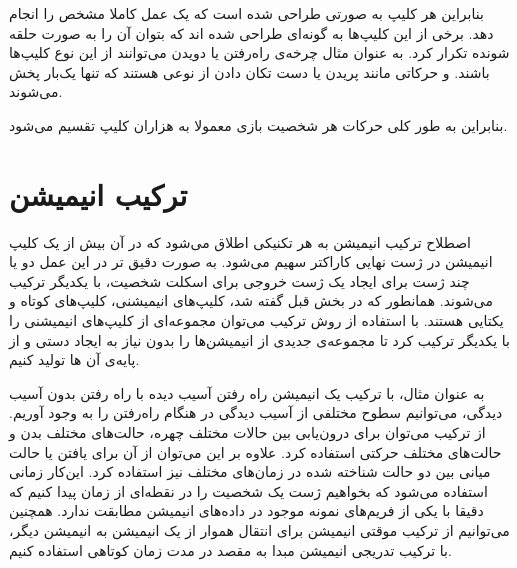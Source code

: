 بنابراین هر کلیپ به صورتی طراحی شده است که یک عمل کاملا مشخص را انجام دهد. برخی از این کلیپ‌ها به گونه‌ای طراحی شده اند که بتوان آن را به صورت حلقه شونده تکرار کرد.
به عنوان مثال چرخه‌ی راه‌رفتن یا دویدن می‌توانند از این نوع کلیپ‌ها باشند.
و حرکاتی مانند پریدن یا دست تکان دادن از نوعی هستند که تنها یک‌بار پخش می‌شوند.

بنابراین به طور کلی حرکات هر شخصیت بازی معمولا به هزاران کلیپ تقسیم می‌شود. \cite{GameEngineArchitecture}

\section{ترکیب انیمیشن}

اصطلاح ترکیب انیمیشن به هر تکنیکی اطلاق می‌شود که در آن بیش از یک کلیپ انیمیشن در ژست نهایی کاراکتر سهیم می‌شود.
به صورت دقیق تر در این عمل دو یا چند ژست برای ایجاد یک ژست خروجی برای اسکلت شخصیت، با یکدیگر ترکیب می‌شوند.
همانطور که در بخش قبل گفته شد، کلیپ‌های انیمیشنی، کلیپ‌های کوتاه و یکتایی هستند. با استفاده از روش ترکیب ‌می‌توان مجموعه‌ای از کلیپ‌های انیمیشنی را با یکدیگر ترکیب کرد تا مجموعه‌ی جدیدی از انیمیشن‌ها را بدون نیاز به ایجاد دستی و از پایه‌ی آن ها تولید کنیم.

به عنوان مثال، با ترکیب یک انیمیشن راه رفتن آسیب دیده با راه رفتن بدون آسیب دیدگی، می‌توانیم سطوح مختلفی از آسیب دیدگی در هنگام راه‌رفتن را به وجود آوریم.
از ترکیب می‌توان برای درون‌یابی بین حالات مختلف چهره، حالت‌های مختلف بدن و حالت‌های مختلف حرکتی استفاده کرد.
علاوه بر این می‌توان از آن برای یافتن یا حالت میانی بین دو حالت شناخته شده در زمان‌های مختلف نیز استفاده کرد. این‌کار زمانی استفاده می‌شود که بخواهیم ژست یک شخصیت را در نقطه‌ای از زمان پیدا کنیم که دقیقا با یکی از فریم‌های نمونه موجود در داده‌های انیمیشن مطابقت ندارد.
همچنین می‌توانیم از ترکیب موقتی انیمیشن برای انتقال هموار از یک انیمیشن به انیمیشن دیگر، با ترکیب تدریجی انیمیشن مبدا به مقصد در مدت زمان کوتاهی استفاده کنیم.